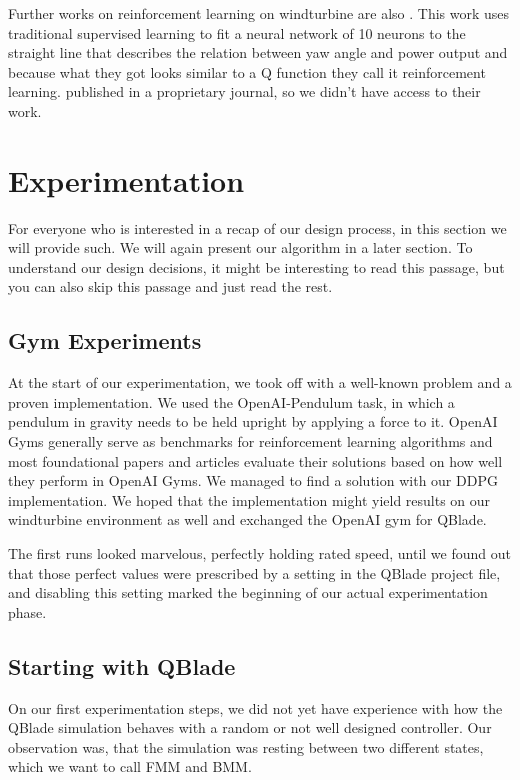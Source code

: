 \documentclass[hyperref,final,beleg]{cgvpub}
\begin{document}
Further works on reinforcement learning on windturbine are also \cite{saenz-aguirreArtificialNeuralNetwork2019}. This work uses traditional supervised learning to fit a neural network of 10 neurons to the straight line that describes the relation between yaw angle and power output and because what they got looks similar to a Q function they call it reinforcement learning. \cite{fernandez-gaunaVariableSpeedWind2016} published in a proprietary journal, so we didn't have access to their work. 


\chapter{Experimentation}

For everyone who is interested in a recap of our design process, in this section we will provide such. We will again present our algorithm in a later section. To understand our design decisions, it might be interesting to read this passage, but you can also skip this passage and just read the rest. 

\section{Gym Experiments}
\label{sec:gymexperiments}
At the start of our experimentation, we took off with a well-known problem and a proven implementation. We used the OpenAI-Pendulum task, in which a pendulum in gravity needs to be held upright by applying a force to it. OpenAI Gyms generally serve as benchmarks for reinforcement learning algorithms and most foundational papers and articles evaluate their solutions based on how well they perform in OpenAI Gyms. We managed to find a solution with our DDPG implementation. We hoped that the implementation might yield results on our windturbine environment as well and exchanged the OpenAI gym for QBlade.

The first runs looked marvelous, perfectly holding rated speed, until we found out that those perfect values were prescribed by a setting in the QBlade project file, and disabling this setting marked the beginning of our actual experimentation phase.

\section{Starting with QBlade}

On our first experimentation steps, we did not yet have experience with how the QBlade simulation behaves with a random or not well designed controller. Our observation was, that the simulation was resting between two different states, which we want to call \ac{FMM} and \ac{BMM}.
\end{document}
